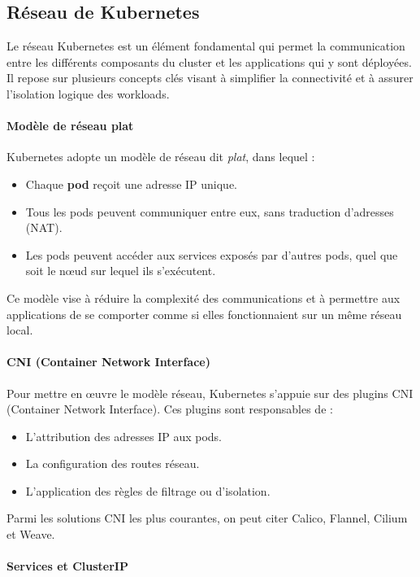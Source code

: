 \subsection{Réseau de Kubernetes}

Le réseau Kubernetes est un élément fondamental qui permet la communication entre les différents composants du cluster et les applications qui y sont déployées. Il repose sur plusieurs concepts clés visant à simplifier la connectivité et à assurer l’isolation logique des workloads.

\paragraph{Modèle de réseau plat}

Kubernetes adopte un modèle de réseau dit \emph{plat}, dans lequel :
\begin{itemize}
	\item Chaque \textbf{pod} reçoit une adresse IP unique.
	\item Tous les pods peuvent communiquer entre eux, sans traduction d’adresses (NAT).
	\item Les pods peuvent accéder aux services exposés par d’autres pods, quel que soit le nœud sur lequel ils s’exécutent.
\end{itemize}
Ce modèle vise à réduire la complexité des communications et à permettre aux applications de se comporter comme si elles fonctionnaient sur un même réseau local.

\paragraph{CNI (Container Network Interface)}

Pour mettre en œuvre le modèle réseau, Kubernetes s’appuie sur des plugins CNI (Container Network Interface).
Ces plugins sont responsables de :
\begin{itemize}
	\item L’attribution des adresses IP aux pods.
	\item La configuration des routes réseau.
	\item L’application des règles de filtrage ou d’isolation.
\end{itemize}
Parmi les solutions CNI les plus courantes, on peut citer Calico, Flannel, Cilium et Weave.

\paragraph{Services et ClusterIP}

